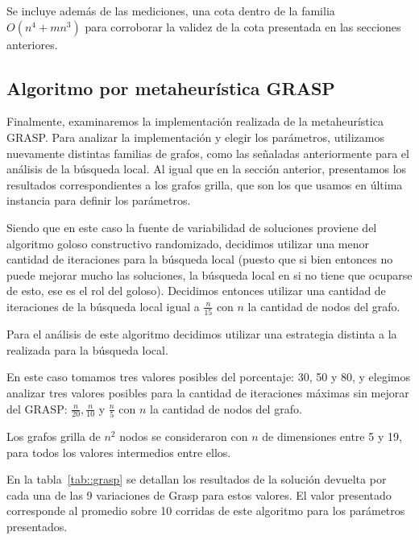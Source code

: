 Se incluye adem\'as de las mediciones, una cota dentro de la familia
$O(n^4 + m n^3)$ para corroborar la validez de la cota presentada en 
las secciones anteriores.

\subsection{Algoritmo por metaheur\'istica GRASP}

Finalmente, examinaremos la implementaci\'on realizada de la 
metaheur\'istica GRASP. Para analizar la implementaci\'on y elegir los
par\'ametros, utilizamos nuevamente distintas familias de grafos, como
las se\~naladas anteriormente para el an\'alisis de la b\'usqueda local.
Al igual que en la secci\'on anterior, presentamos los resultados 
correspondientes a los grafos grilla, que son los que usamos en 
\'ultima instancia para definir los par\'ametros.

Siendo que en este caso la fuente de variabilidad de soluciones proviene
del algoritmo goloso constructivo randomizado, decidimos utilizar una
menor cantidad de iteraciones para la b\'usqueda local (puesto que si 
bien entonces no puede mejorar mucho las soluciones, la b\'usqueda 
local en si no tiene que ocuparse de esto, ese es el rol del goloso).
Decidimos entonces utilizar una cantidad de iteraciones de la b\'usqueda
local igual a $\frac{n}{15}$ con $n$ la cantidad de nodos del grafo.

Para el an\'alisis de este algoritmo decidimos utilizar una estrategia 
distinta a  la realizada para la b\'usqueda local.

En este caso tomamos tres valores posibles del porcentaje: 30, 50 y 80,
y elegimos analizar tres valores posibles para la cantidad de 
iteraciones m\'aximas sin mejorar del GRASP: 
$\frac{n}{20}, \frac{n}{10}$ y $\frac{n}{5}$ con $n$ la cantidad de 
nodos del grafo.

Los grafos grilla de $n^2$ nodos se consideraron con $n$ de dimensiones 
entre 5 y 19, para todos los valores intermedios entre ellos.

En la tabla~\ref{tab::grasp} se detallan los resultados de la 
soluci\'on devuelta por cada una de las 9 variaciones de Grasp para 
estos valores. El valor presentado corresponde al promedio sobre 10 
corridas de este algoritmo para los par\'ametros presentados.

